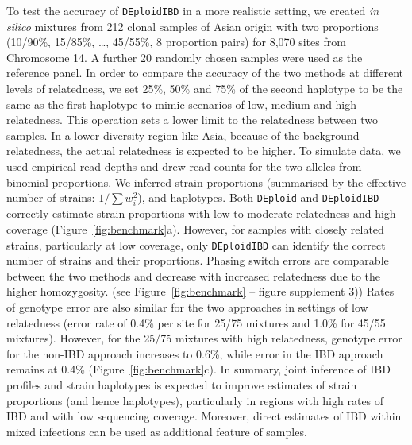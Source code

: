 \documentclass[9pt,lineno]{elife}
\begin{document}
To test the accuracy of \texttt{DEploidIBD} in a more realistic setting, we created {\it in silico} mixtures from 212 clonal samples of Asian origin with two proportions (10/90\%, 15/85\%, \dots, 45/55\%, 8 proportion pairs) for 8,070 sites from Chromosome 14.  A further 20 randomly chosen samples were used as the reference panel. In order to compare the accuracy of the two methods at different levels of relatedness, we set 25\%, 50\% and 75\% of the second haplotype to be the same as the first haplotype to mimic scenarios of low, medium and high relatedness. This operation sets a lower limit to the relatedness between two samples. In a lower diversity region like Asia, because of the background relatedness, the actual relatedness is expected to be higher.  To simulate data, we used empirical read depths and drew read counts for the two alleles from binomial proportions.  We inferred strain proportions (summarised by the effective number of strains: $1/\sum w_{i}^{2}$), and haplotypes.  Both \texttt{DEploid} and \texttt{DEploidIBD} correctly estimate strain proportions with low to moderate relatedness and high coverage (Figure~\ref{fig:benchmark}a).  However, for samples with closely related strains, particularly at low coverage, only \texttt{DEploidIBD} can identify the correct number of strains and their proportions.  Phasing switch errors are comparable between the two methods and decrease with increased relatedness due to the higher homozygosity. (see Figure~\ref{fig:benchmark} -- figure supplement 3)) Rates of genotype error are also similar for the two approaches in settings of low relatedness (error rate of 0.4\% per site for 25/75 mixtures and 1.0\% for 45/55 mixtures).  However, for the 25/75 mixtures with high relatedness, genotype error for the non-IBD approach increases to 0.6\%, while error in the IBD approach remains at 0.4\% (Figure~\ref{fig:benchmark}c).  In summary, joint inference of IBD profiles and strain haplotypes is expected to improve estimates of strain proportions (and hence haplotypes), particularly in regions with high rates of IBD and with low sequencing coverage.  Moreover, direct estimates of IBD within mixed infections can be used as additional feature of samples.
\end{document}
